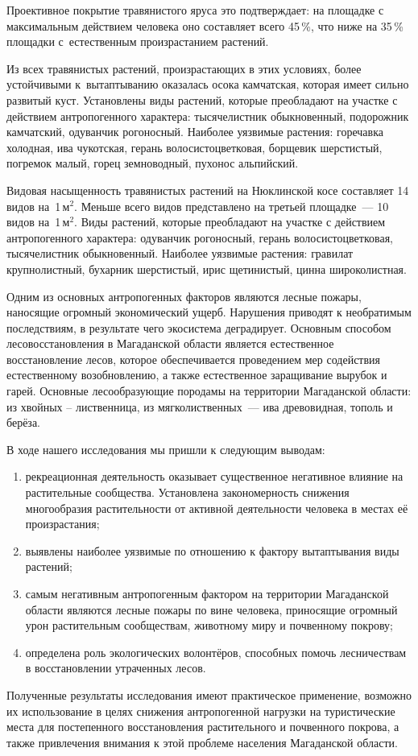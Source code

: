 Проективное покрытие травянистого яруса это подтверждает: на площадке с максимальным действием человека оно составляет всего 45\,\%, что ниже на 35\,\% площадки с~естественным произрастанием растений.

Из всех травянистых растений, произрастающих в этих условиях, более устойчивыми к~вытаптыванию оказалась осока камчатская, которая имеет сильно развитый куст. Установлены виды растений, которые преобладают на участке с действием антропогенного характера: тысячелистник обыкновенный, подорожник камчатский, одуванчик рогоносный. Наиболее уязвимые растения: горечавка холодная, ива чукотская, герань волосистоцветковая, борщевик шерстистый, погремок малый, горец земноводный, пухонос альпийский.

Видовая насыщенность травянистых растений на Нюклинской косе составляет 14 видов на~1\,м$^2$. Меньше всего видов представлено на третьей площадке~--- 10 видов на~1\,м$^2$. Виды растений, которые преобладают на участке с действием антропогенного характера: одуванчик рогоносный, герань волосистоцветковая, тысячелистник обыкновенный. Наиболее уязвимые растения: гравилат крупнолистный, бухарник шерстистый, ирис щетинистый, цинна широколистная.

Одним из основных антропогенных факторов являются лесные пожары, наносящие огромный экономический ущерб. Нарушения приводят к необратимым последствиям, в результате чего экосистема деградирует. Основным способом лесовосстановления в Магаданской области является естественное восстановление лесов, которое обеспечивается проведением мер содействия естественному возобновлению, а также естественное заращивание вырубок и гарей. Основные лесообразующие породамы на территории Магаданской области: из хвойных – лиственница, из мягколиственных~--- ива древовидная, тополь и берёза.

В ходе нашего исследования мы пришли к следующим выводам:

\begin{enumerate}[noitemsep]\vspace{-8pt}
\item рекреационная деятельность оказывает существенное негативное влияние на растительные сообщества. Установлена закономерность снижения многообразия растительности от активной деятельности человека в местах её произрастания;
\item выявлены наиболее уязвимые по отношению к фактору вытаптывания виды растений;
\item самым негативным антропогенным фактором на территории Магаданской области являются лесные пожары по вине человека, приносящие огромный урон растительным сообществам, животному миру и почвенному покрову;
\item определена роль экологических волонтёров, способных помочь лесничествам в восстановлении утраченных лесов.
\end{enumerate}\vspace{-8pt}

Полученные результаты исследования имеют практическое применение, возможно их использование в целях снижения антропогенной нагрузки на туристические места для постепенного восстановления растительного и почвенного покрова, а также привлечения внимания к этой проблеме населения Магаданской области.\enlargethispage{\baselineskip}
